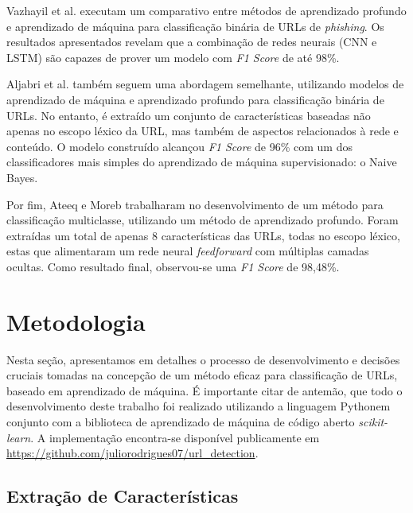 \documentclass[manuscript,screen,review]{acmart}
\begin{document}
Vazhayil et al. \cite{8494159} executam um comparativo entre métodos de aprendizado profundo e aprendizado de máquina para classificação binária de URLs de \emph{phishing}. Os resultados apresentados revelam que a combinação de redes neurais (CNN e LSTM) são capazes de prover um modelo com \emph{F1 Score} de até 98\%.

Aljabri et al. \cite{10.1155/2022/3241216} também seguem uma abordagem semelhante, utilizando modelos de aprendizado de máquina e aprendizado profundo para classificação binária de URLs. No entanto, é extraído um conjunto de características baseadas não apenas no escopo léxico da URL, mas também de aspectos relacionados à rede e conteúdo. O modelo construído alcançou \emph{F1 Score} de 96\% com um dos classificadores mais simples do aprendizado de máquina supervisionado: o Naive Bayes.

Por fim, Ateeq e Moreb \cite{9493481} trabalharam no desenvolvimento de um método para classificação multiclasse, utilizando um método de aprendizado profundo. Foram extraídas um total de apenas 8 características das URLs, todas no escopo léxico, estas que alimentaram um rede neural \emph{feedforward} com múltiplas camadas ocultas. Como resultado final, observou-se uma \emph{F1 Score} de 98,48\%. 

\section{Metodologia} \label{sec:3}

Nesta seção, apresentamos em detalhes o processo de desenvolvimento e decisões cruciais tomadas na concepção de um método eficaz para classificação de URLs, baseado em aprendizado de máquina. É importante citar de antemão, que todo o desenvolvimento deste trabalho foi realizado utilizando a linguagem Python\footnotemark \hspace{0.1cm}em conjunto com a biblioteca de aprendizado de máquina de código aberto \emph{scikit-learn\footnotemark}. A implementação encontra-se disponível publicamente em \url{https://github.com/juliorodrigues07/url_detection}.


\subsection{Extração de Características}
\end{document}
